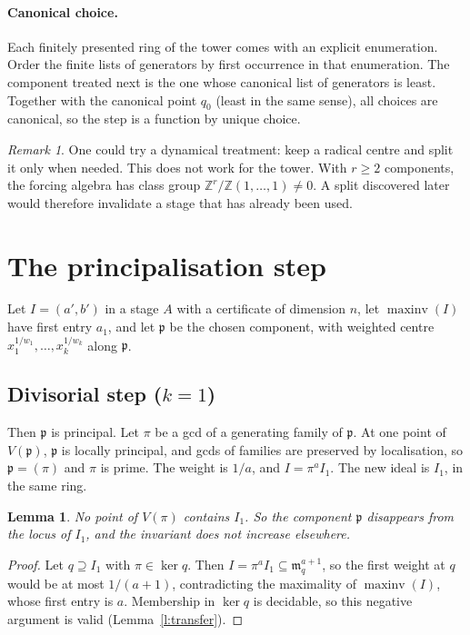 \documentclass[11pt]{article}
\newcommand{\Z}{\mathbb{Z}}
\newcommand{\p}{\mathfrak{p}}
\newcommand{\m}{\mathfrak{m}}
\newcommand{\maxinv}{\operatorname{maxinv}}
\numberwithin{equation}{section}
\theoremstyle{plain}
\newtheorem{lemma}[theorem]{Lemma}
\theoremstyle{definition}
\theoremstyle{remark}
\newtheorem*{remark}{Remark}
\begin{document}
\paragraph{Canonical choice.} Each finitely presented ring of the tower comes with an explicit
enumeration. Order the finite lists of generators by first occurrence in that enumeration. The
component treated next is the one whose canonical list of generators is least. Together with the
canonical point $q_0$ (least in the same sense), all choices are canonical, so the step is a
function by unique choice.

\begin{remark}
One could try a dynamical treatment: keep a radical centre and split it only when needed. This does
not work for the tower. With $r\ge2$ components, the forcing algebra has class group
$\Z^r/\Z(1,\dots,1)\ne0$. A split discovered later would therefore invalidate a stage that has
already been used.
\end{remark}

\section{The principalisation step}\label{s:steps}

Let $I=(a',b')$ in a stage $A$ with a certificate of dimension $n$, let $\maxinv(I)$ have first
entry $a_1$, and let $\p$ be the chosen component, with weighted centre $x_1^{1/w_1},\dots,
x_k^{1/w_k}$ along $\p$.

\subsection{Divisorial step ($k=1$)}

Then $\p$ is principal. Let $\pi$ be a gcd of a generating family of $\p$. At one point of $V(\p)$,
$\p$ is locally principal, and gcds of families are preserved by localisation, so $\p=(\pi)$ and
$\pi$ is prime.
The weight is $1/a$, and $I=\pi^aI_1$. The new ideal is $I_1$, in the same ring.

\begin{lemma}
No point of $V(\pi)$ contains $I_1$. So the component $\p$ disappears from the locus of $I_1$, and the
invariant does not increase elsewhere.
\end{lemma}

\begin{proof}
Let $q\supseteq I_1$ with $\pi\in\ker q$. Then $I=\pi^aI_1\subseteq\m_q^{a+1}$, so the first weight
at $q$ would be at most $1/(a+1)$, contradicting the maximality of $\maxinv(I)$, whose first entry is $a$. Membership in $\ker q$ is
decidable, so this negative argument is valid (Lemma~\ref{l:transfer}).
\end{proof}
\end{document}
